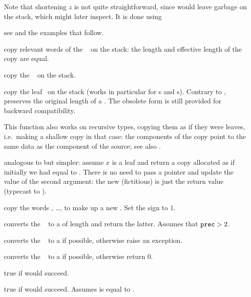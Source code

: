 Note that shortening $z$ is not quite straightforward, since 
would leave garbage on the stack, which  might later inspect.
It is done using

 see  and the examples that
follow.


 copy relevant words of the ~ on the
stack: the length and effective length of the copy are equal.

 copy the ~ on the stack.

 copy the leaf~ on the
stack (works in particular for s and s).
Contrary to ,  preserves the original
length of a . The obsolete form 
is still provided for backward compatibility.

This function also works on recursive types, copying them as if they were
leaves, i.e.~making a shallow copy in that case: the components of the copy
point to the same data as the component of the source; see also
.

 analogous to 
but simpler: assume $x$ is a leaf and return a copy allocated as if
initially we had  equal to . There is no need to pass a
pointer and update the value of the second argument: the new (fictitious)
 is just the return value (typecast to ).

 copy the  words
, \dots,  to make up a new . Set the sign
to $1$.


 converts the ~ to a
 of length  and return the latter.
Assumes that ${\tt prec} > 2$.

 converts the ~ to a  if
possible, otherwise raise an exception.

 converts the ~ to a  if
possible, otherwise return $0$.

 true if  would succeed.

 true if  would succeed.
Assumes  is equal to .

